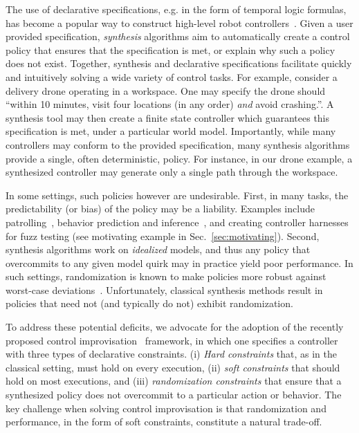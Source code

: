 The use of declarative specifications, e.g. in the form of temporal logic formulas, has become a popular way to construct high-level robot controllers~\cite{DBLP:conf/iros/HorowitzWM14, DBLP:conf/rss/WongEK14, DBLP:conf/iros/HeLKV17, DBLP:conf/icra/FuATP16, DBLP:conf/icra/HeWKV19, DBLP:journals/arobots/MoarrefK20, DBLP:conf/icra/KantarosM0P20}.
Given a user provided specification, \emph{synthesis} algorithms aim
to automatically create a control policy that ensures that the
specification is met, or explain why such a policy does not
exist. Together, synthesis and declarative specifications facilitate
quickly and intuitively solving a wide variety of control tasks.  For
example, consider a delivery drone operating in a workspace. One may
specify the drone should ``within 10 minutes, visit four locations (in any
order) \emph{and} avoid crashing.''. A synthesis tool may then create a
finite state controller which guarantees this specification is met,
under a particular world model.
Importantly, while many controllers may conform to the
provided specification, many synthesis algorithms provide a
single, often deterministic, policy.  For instance, in our drone
example, a synthesized controller may generate only a single path
through the workspace.

In some settings, such policies however are undesirable.  First, in
many tasks, the predictability (or bias) of the policy may be a
liability.  Examples include
patrolling~\cite{DBLP:journals/ior/AlpernMP11}, behavior prediction
and inference~\cite{DBLP:conf/cav/Vazquez-Chanlatte20}, and creating
controller harnesses for fuzz testing (see motivating
example in Sec.~\ref{sec:motivating}). Second, synthesis algorithms work on \emph{idealized}
models, and thus any policy that overcommits to any given model quirk
may in practice yield poor performance. In such settings,
randomization is known to make policies more robust against worst-case
deviations~\cite{mceThesis, maxEntAnswer}. Unfortunately, classical 
synthesis methods result in policies that need not (and typically do
not) exhibit randomization.

To address these potential deficits, we advocate for the adoption of
the recently proposed control
improvisation~\cite{DBLP:conf/cav/FremontS18,DBLP:conf/fsttcs/FremontDSW15}
framework, in which one specifies a controller with three types of
declarative constraints. (i) \emph{Hard constraints} that, as in the
classical setting, must hold on every execution, (ii) \emph{soft constraints} that should hold 
on most executions, and (iii) \emph{randomization
constraints} that ensure that a synthesized policy does not overcommit to a particular action or behavior. 
The key challenge when solving control improvisation is that randomization and performance, in the form of soft constraints, constitute a natural trade-off.

